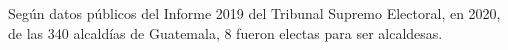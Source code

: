 Según datos públicos del Informe 2019 del Tribunal Supremo Electoral, en 2020, de las 340 alcaldías de Guatemala, 8 fueron electas para ser alcaldesas. 